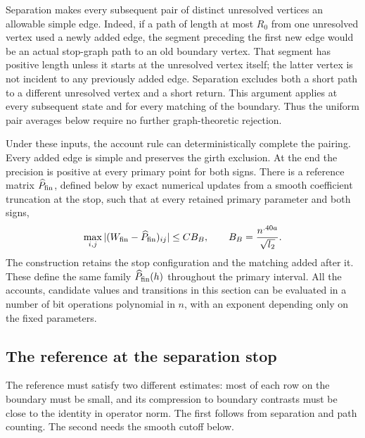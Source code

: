 Separation makes every subsequent pair of distinct unresolved vertices an
allowable simple edge.  Indeed, if a path of length at most $R_0$ from one
unresolved vertex used a newly added edge, the segment preceding the first
new edge would be an actual stop-graph path to an old boundary vertex.
That segment has positive length unless it starts at the unresolved
vertex itself; the latter vertex is not incident to any previously
added edge.  Separation excludes both a short path to a different
unresolved vertex and a short return.  This argument applies at every
subsequent state and for every matching of the boundary.  Thus the
uniform pair averages below require no further graph-theoretic rejection.

\begin{samepage}
\begin{proposition}
\label{prop:boundary-completion}
Under these inputs, the account rule can deterministically complete the
pairing.  Every added edge is simple and preserves the girth exclusion.
At the end the precision is positive at every primary point for both
signs.  There is a reference matrix $\widehat P_{\rm fin}$, defined below
by exact numerical updates from a smooth coefficient truncation at the
stop, such that at every retained primary parameter and both signs,
\[
 \max_{i,j}|(W_{\rm fin}-\widehat P_{\rm fin})_{ij}|
 \le C B_B,
 \qquad B_B=\frac{n^{.40a}}{\sqrt{l_2}}.
\]
The construction retains the stop configuration and the matching added
after it.  These define the same family $\widehat P_{\rm fin}(h)$ throughout
the primary interval.
All the accounts, candidate values and transitions in this section can
be evaluated in a number of bit operations polynomial in $n$, with an
exponent depending only on the fixed parameters.
\end{proposition}
\end{samepage}

\subsection{The reference at the separation stop}
\label{subsec:boundary-reference}

The reference must satisfy two different estimates: most of each row on
the boundary must be small, and its compression to boundary contrasts
must be close to the identity in operator norm.  The first follows from
separation and path counting.  The second needs the smooth cutoff below.

